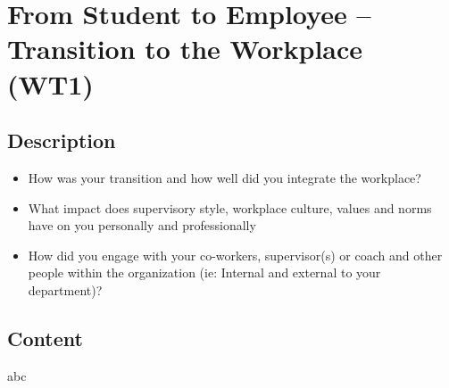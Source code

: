 \newpage
\section{From Student to Employee – Transition to the Workplace (WT1)}

\subsection{Description}

\begin{itemize}
    \item How was your transition and how well did you integrate the workplace?
    \item What impact does supervisory style, workplace culture, values and norms have on you personally and professionally
    \item How did you engage with your co-workers, supervisor(s) or coach and other people within the organization (ie: Internal and external to your department)?
\end{itemize}

\subsection{Content}

abc

